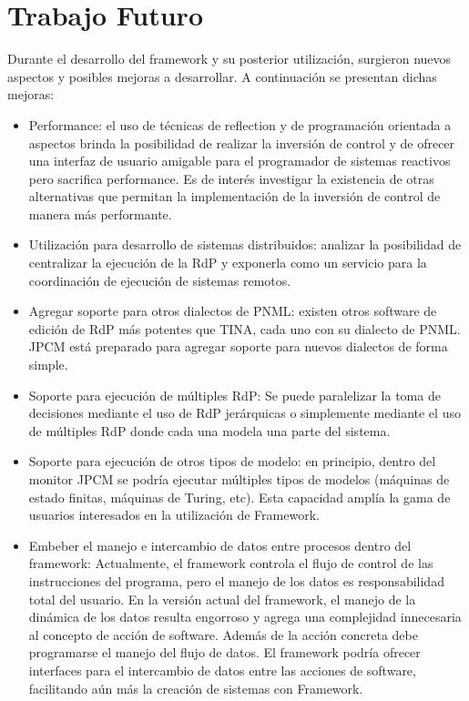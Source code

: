 \section{Trabajo Futuro}
Durante el desarrollo del framework y su posterior utilización, surgieron nuevos
aspectos y posibles mejoras a desarrollar. A continuación se presentan dichas
mejoras:
\begin{itemize}
  \item Performance: el uso de técnicas de reflection y de programación
  orientada a aspectos brinda la posibilidad de realizar la inversión de control
  y de ofrecer una interfaz de usuario amigable para el programador de sistemas
  reactivos pero sacrifica performance. Es de interés investigar la existencia 
  de otras alternativas que permitan la implementación de la inversión de
  control de manera más performante.
  \item Utilización para desarrollo de sistemas distribuidos: analizar la
  posibilidad de centralizar la ejecución de la RdP y exponerla como un servicio
  para la coordinación de ejecución de sistemas remotos.
  \item Agregar soporte para otros dialectos de PNML: existen otros software de
  edición de RdP más potentes que TINA, cada uno con su dialecto de PNML. JPCM
  está preparado para agregar soporte para nuevos dialectos de forma simple.
  \item Soporte para ejecución de múltiples RdP: Se puede paralelizar la toma
  de decisiones mediante el uso de RdP jerárquicas o simplemente mediante el
  uso de múltiples RdP donde cada una modela una parte del sistema.
  \item Soporte para ejecución de otros tipos de modelo: en principio, dentro
  del monitor JPCM se podría ejecutar múltiples tipos de modelos (máquinas de
  estado finitas, máquinas de Turing, etc). Esta capacidad amplía la gama de
  usuarios interesados en la utilización de \nombreFramework Framework.
  \item Embeber el manejo e intercambio de datos entre procesos dentro del
  framework: Actualmente, el framework controla el flujo de control de las
  instrucciones del programa, pero el manejo de los datos es responsabilidad
  total del usuario. En la versión actual del framework, el manejo de la
  dinámica de los datos resulta engorroso y agrega una complejidad innecesaria
  al concepto de acción de software. Además de la acción concreta debe
  programarse el manejo del flujo de datos. El framework podría ofrecer
  interfaces para el intercambio de datos entre las acciones de software,
  facilitando aún más la creación de sistemas con \nombreFramework Framework.
\end{itemize}



